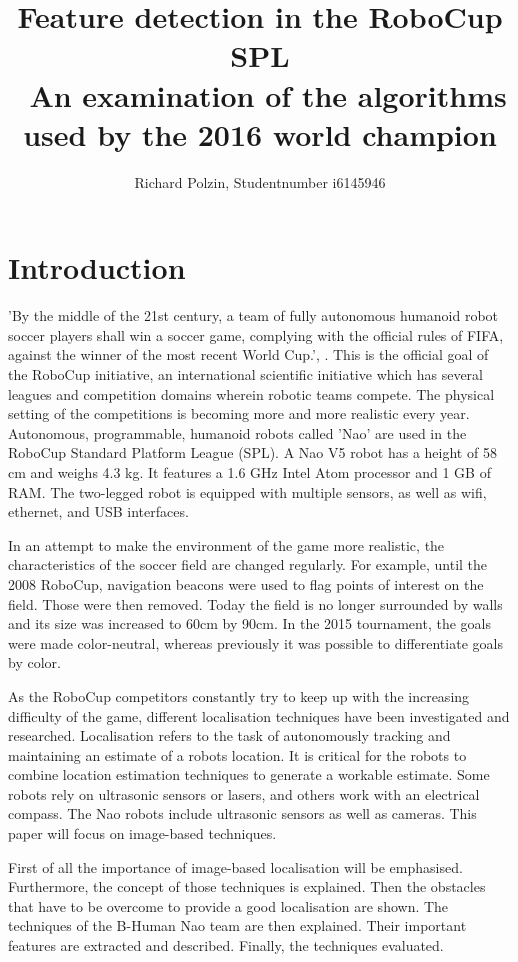 \documentclass[12pt, a4paper, doc]{apa6}
\author{Richard Polzin, Studentnumber i6145946}
\affiliation{\today, Academic Writing, Tutor: Denise McAllister}
\title{Feature detection in the RoboCup SPL \\\ \large{An examination of the algorithms used by the 2016 world champion}}
\begin{document}
  \maketitle
  \setlength{\parindent}{0pt}

  \section{Introduction}
  \noindent 'By the middle of the 21st century, a team of fully autonomous humanoid robot soccer players shall win a soccer game, complying with the official rules of FIFA, against the winner of the most recent World Cup.', \cite{Kitano95robocup:the}. This is the official goal of the RoboCup initiative, an international scientific initiative which has several leagues and competition domains wherein robotic teams compete. The physical setting of the competitions is becoming more and more realistic every year. Autonomous, programmable, humanoid robots called 'Nao' are used in the RoboCup Standard Platform League (SPL). A Nao V5 robot has a height of 58 cm and weighs 4.3 kg. It features a 1.6 GHz Intel Atom processor and 1 GB of RAM. The two-legged robot is equipped with multiple sensors, as well as wifi, ethernet, and USB interfaces.

  In an attempt to make the environment of the game more realistic, the characteristics of the soccer field are changed regularly. For example, until the 2008 RoboCup, navigation beacons were used to flag points of interest on the field. Those were then removed. Today the field is no longer surrounded by walls and its size was increased to 60cm by 90cm. In the 2015 tournament, the goals were made color-neutral, whereas previously it was possible to differentiate goals by color.

  As the RoboCup competitors constantly try to keep up with the increasing difficulty of the game, different localisation techniques have been investigated and researched. Localisation refers to the task of autonomously tracking and maintaining an estimate of a robots location. It is critical for the robots to combine location estimation techniques to generate a workable estimate. Some robots rely on ultrasonic sensors or lasers, and others work with an electrical compass. The Nao robots include ultrasonic sensors as well as cameras. This paper will focus on image-based techniques.

  First of all the importance of image-based localisation will be emphasised. Furthermore, the concept of those techniques is explained. Then the obstacles that have to be overcome to provide a good localisation are shown. The techniques of the B-Human Nao team are then explained. Their important features are extracted and described. Finally, the techniques evaluated.
\end{document}
